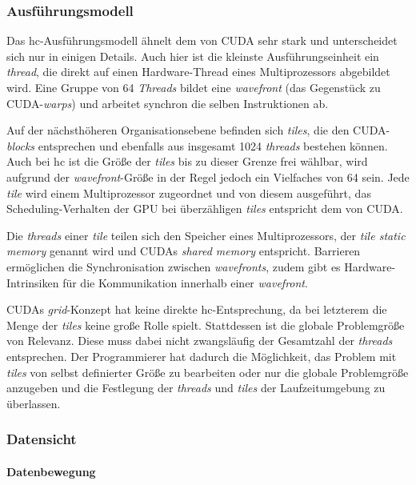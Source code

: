 \subsubsection{Ausführungsmodell}

Das \gls{hc}-Ausführungsmodell ähnelt dem von CUDA sehr stark und unterscheidet
sich nur in einigen Details. Auch hier ist die kleinste Ausführungseinheit ein
\textit{thread}, die direkt auf einen Hardware-Thread eines Multiprozessors
abgebildet wird. Eine Gruppe von 64 \textit{Threads} bildet eine
\textit{wavefront} (das Gegenstück zu CUDA-\textit{warps}) und arbeitet synchron
die selben Instruktionen ab.

Auf der nächsthöheren Organisationsebene befinden sich \textit{tiles}, die
den CUDA-\textit{blocks} entsprechen und ebenfalls aus insgesamt \num{1024}
\textit{threads} bestehen können. Auch bei \gls{hc} ist die Größe der
\textit{tiles} bis zu dieser Grenze frei wählbar, wird aufgrund der
\textit{wavefront}-Größe in der Regel jedoch ein Vielfaches von 64 sein. Jede
\textit{tile} wird einem Multiprozessor zugeordnet und von diesem ausgeführt,
das Scheduling-Verhalten der GPU bei überzähligen \textit{tiles} entspricht
dem von CUDA.

Die \textit{threads} einer \textit{tile} teilen sich den Speicher eines
Multiprozessors, der \textit{tile static memory} genannt wird und CUDAs
\textit{shared memory} entspricht. Barrieren ermöglichen die Synchronisation
zwischen \textit{wavefronts}, zudem gibt es Hardware-Intrinsiken für die
Kommunikation innerhalb einer \textit{wavefront}.

CUDAs \textit{grid}-Konzept hat keine direkte \gls{hc}-Entsprechung, da
bei letzterem die Menge der \textit{tiles} keine große Rolle spielt. Stattdessen
ist die globale Problemgröße von Relevanz. Diese muss dabei nicht zwangsläufig
der Gesamtzahl der \textit{threads} entsprechen. Der Programmierer hat dadurch
die Möglichkeit, das Problem mit \textit{tiles} von selbst definierter Größe
zu bearbeiten oder nur die globale Problemgröße anzugeben und die Festlegung der
\textit{threads} und \textit{tiles} der Laufzeitumgebung zu überlassen.

\subsubsection{Datensicht}

\paragraph{Datenbewegung}


